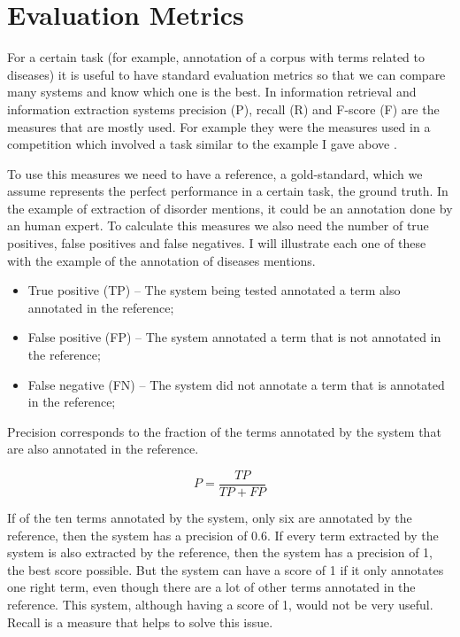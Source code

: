 \section{Evaluation Metrics}
\label{Evaluation Metrics}

For a certain task (for example, annotation of a corpus with terms related to diseases) it is useful to have standard evaluation metrics so that we can compare many systems and know which one is the best. In information retrieval and information extraction systems precision (P), recall (R) and F-score (F) are the measures that are mostly used. For example they were the measures used in a competition which involved a task similar to the example I gave above \citep{Elhadad2015}.

To use this measures we need to have a reference, a gold-standard, which we assume represents the perfect performance in a certain task, the ground truth. In the example of extraction of disorder mentions, it could be an annotation done by an human expert. To calculate this measures we also need the number of true positives, false positives and false negatives. I will illustrate each one of these with the example of the annotation of diseases mentions.

\begin{itemize}
\item True positive (TP) – The system being tested annotated a term also annotated in the reference;
\item False positive (FP) – The system annotated a term that is not annotated in the reference;
\item False negative (FN) – The system did not annotate a term that is annotated in the reference;
\end{itemize}

Precision corresponds to the fraction of the terms annotated by the system that are also annotated in the reference.

\begin{equation}
P = \frac{TP}{TP+FP}
\end{equation}

If of the ten terms annotated by the system, only six are annotated by the reference, then the system has a precision of 0.6. If every term extracted by the system is also extracted by the reference, then the system has a precision of 1, the best score possible. But the system can have a score of 1 if it only annotates one right term, even though there are a lot of other terms annotated in the reference. This system, although having a score of 1, would not be very useful. Recall is a measure that helps to solve this issue.

